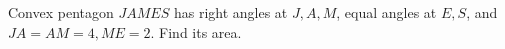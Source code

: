 Convex pentagon $JAMES$ has right angles at $J,A,M$, equal angles at $E,S$, and $JA=AM=4,ME=2$. Find its area.
